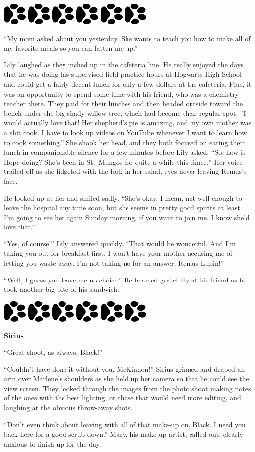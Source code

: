 \documentclass[12pt,twoside,openright]{memoir}
\newcommand{\dogPrintRule}{	
	\begin{center}
		\hspace{.5em}
		\includegraphics[angle=60]{dogprint.pdf}
		\hspace{.5em}
		\includegraphics[angle=120]{dogprint.pdf}
		\hspace{.5em}
		\includegraphics[angle=60]{dogprint.pdf}
		\hspace{.5em}
		\includegraphics[angle=120]{dogprint.pdf}
		\hspace{.5em}
		\includegraphics[angle=60]{dogprint.pdf}
		\hspace{.5em}
		\includegraphics[angle=120]{dogprint.pdf}
		\hspace{.5em}
	\end{center}
}
\begin{document}
\dogPrintRule

``My mom asked about you yesterday. She wants to teach you how to make all of my favorite meals so you can fatten me up.''


Lily laughed as they inched up in the cafeteria line. He really enjoyed the days that he was doing his supervised field practice hours at Hogwarts High School and could get a fairly decent lunch for only a few dollars at the cafeteria. Plus, it was an opportunity to spend some time with his friend, who was a chemistry teacher there. They paid for their lunches and then headed outside toward the bench under the big shady willow tree, which had become their regular spot.
``I would actually love that! Her shepherd's pie is amazing, and my own mother was a shit cook. I have to look up videos on YouTube whenever I want to learn how to cook something.'' She shook her head, and they both focused on eating their lunch in companionable silence for a few minutes before Lily asked, ``So, how is Hope doing? She's been in St.\ Mungos for quite a while this time…'' Her voice trailed off as she fidgeted with the fork in her salad, eyes never leaving Remus's face. 

He looked up at her and smiled sadly. ``She's okay. I mean, not well enough to leave the hospital any time soon, but she seems in pretty good spirits at least. I'm going to see her again Sunday morning, if you want to join me. I know she'd love that.''

``Yes, of course!'' Lily answered quickly. ``That would be wonderful. And I'm taking you out for breakfast first. I won't have your mother accusing me of letting you waste away. I'm not taking no for an answer, Remus Lupin!'' 

``Well, I guess you leave me no choice.'' He beamed gratefully at his friend as he took another big bite of his sandwich. 

\dogPrintRule

\textbf{Sirius} 

``Great shoot, as always, Black!''

``Couldn't have done it without you, McKinnon!'' Sirius grinned and draped an arm over Marlene's shoulders as she held up her camera so that he could see the view screen. They looked through the images from the photo shoot making notes of the ones with the best lighting, or those that would need more editing, and laughing at the obvious throw-away shots. 

``Don't even think about leaving with all of that make-up on, Black. I need you back here for a good scrub down.'' Mary, his make-up artist, called out, clearly anxious to finish up for the day.
\end{document}
